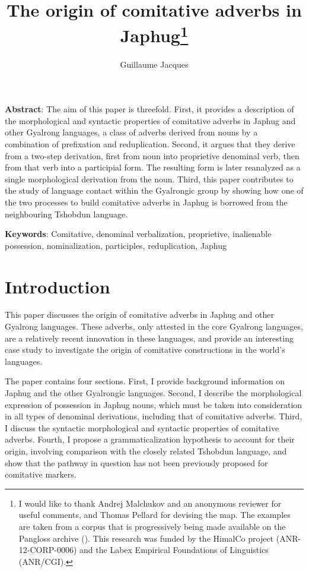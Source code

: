 \documentclass[oldfontcommands,oneside,a4paper,11pt]{article}
\begin{document}
 
 \title{The origin of comitative adverbs in Japhug\footnote{I would like to thank Andrej Malchukov and an anonymous reviewer for useful comments, and Thomas Pellard for devising the map. The examples are taken from a corpus that is progressively being made available on the Pangloss archive (\citealt{michailovsky14pangloss}). This research was funded by the HimalCo project (ANR-12-CORP-0006) and  the Labex Empirical Foundations of Linguistics (ANR/CGI). }}
 \author{Guillaume Jacques }
 \maketitle 
 
 \textbf{Abstract}: The aim of this paper is threefold. First, it provides a description of the morphological and syntactic properties of comitative adverbs in Japhug and other Gyalrong languages, a class of adverbs derived from nouns by a combination of prefixation and reduplication. Second, it argues that they derive from a two-step derivation, first from noun into proprietive denominal verb, then from that verb into a participial form. The resulting form is later reanalyzed as a single morphological derivation from the noun. Third, this paper contributes to the study of language contact within the Gyalrongic group by showing how one of the two processes to build comitative adverbs in Japhug is borrowed from the neighbouring Tshobdun language.


\textbf{Keywords}: Comitative, denominal verbalization, proprietive, inalienable possession, nominalization, participles, reduplication, Japhug

\section*{Introduction}
This paper discusses the origin of comitative adverbs in Japhug and other Gyalrong languages. These adverbs, only attested in the core Gyalrong languages, are a relatively recent innovation in these languages, and provide an interesting case study to investigate the origin of comitative constructions in the world's languages.

The paper contains four sections.  First, I provide background information on Japhug and the other Gyalrongic languages. Second, I describe the morphological expression of possession in Japhug nouns, which must be taken into consideration in all types of denominal derivations, including that of comitative adverbs. Third, I discuss the syntactic morphological and syntactic properties of comitative adverbs. Fourth, I propose a grammaticalization hypothesis to account for their origin, involving comparison with the closely related Tshobdun language, and show that the pathway in question has not been previously proposed for comitative markers.
\end{document}
